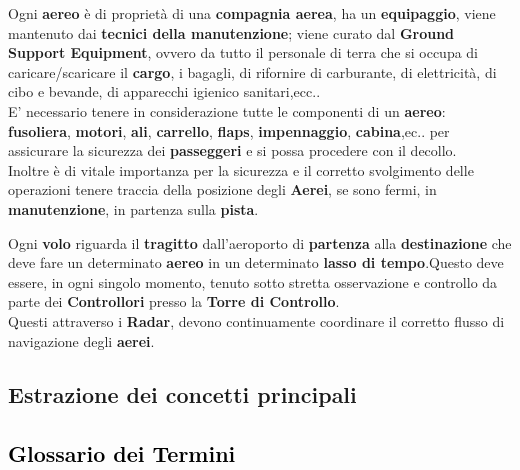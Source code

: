 \textsf{\small Ogni \textbf{aereo} è di proprietà di una \textbf{compagnia aerea}, ha un \textbf{equipaggio}, viene mantenuto dai \textbf{tecnici della manutenzione}; viene curato dal \textbf{Ground Support Equipment}, ovvero da tutto il personale di terra che si occupa di caricare/scaricare il \textbf{cargo}, i bagagli, di rifornire di carburante, di elettricità, di cibo e bevande, di apparecchi igienico sanitari,ecc.. }\\

\textsf{\small E' necessario tenere in considerazione tutte le componenti di un \textbf{aereo}: \textbf{fusoliera}, \textbf{motori}, \textbf{ali}, \textbf{carrello}, \textbf{flaps}, \textbf{impennaggio}, \textbf{cabina},ec.. per assicurare la sicurezza dei \textbf{passeggeri} e si possa procedere con il decollo.}\\

\textsf{\small Inoltre è di vitale importanza per la sicurezza e il corretto svolgimento delle operazioni tenere traccia della posizione degli \textbf{Aerei}, se sono fermi, in \textbf{manutenzione}, in partenza sulla \textbf{pista}.}\break

\textsf{\small Ogni \textbf{volo} riguarda il \textbf{tragitto} dall'aeroporto di \textbf{partenza} alla \textbf{destinazione} che deve fare un determinato \textbf{aereo} in un determinato \textbf{lasso di tempo}.Questo deve essere, in ogni singolo momento, tenuto sotto stretta osservazione e controllo da parte dei \textbf{Controllori} presso la \textbf{Torre di Controllo}.}\\

\textsf{\small Questi attraverso i \textbf{Radar}, devono continuamente coordinare il corretto flusso di navigazione degli \textbf{aerei}.}\\

\newpage

\enlargethispage{1\linewidth}

\subsection{Estrazione dei concetti principali}

\subsection{\textcolor{black}{Glossario dei Termini}}


